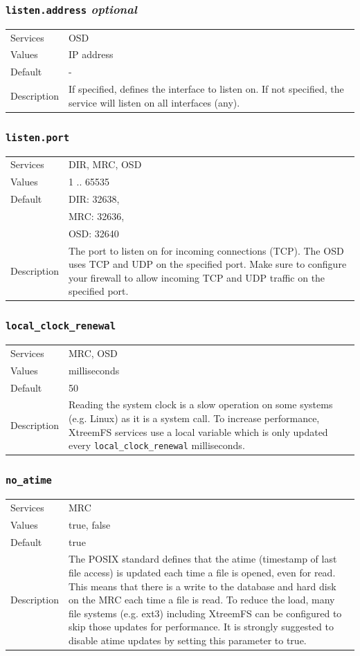 \documentclass[a4paper,10pt]{book}
\begin{document}
\subsubsection{\texttt{listen.address} \textit{optional}}
\begin{tabular}{lp{10cm}}
 Services & OSD\\
 Values   & IP address \\
 Default  & -\\
 Description & If specified, defines the interface to listen on. If not specified, the service will listen on all interfaces (any).
\end{tabular}

\subsubsection{\texttt{listen.port}}
\begin{tabular}{lp{10cm}}
 Services & DIR, MRC, OSD\\
 Values   & 1 .. 65535 \\
 Default  & DIR: 32638,\\
 & MRC: 32636,\\
 & OSD: 32640 \\
 Description & The port to listen on for incoming connections (TCP). The OSD uses TCP and UDP on the specified port. Make sure to configure your firewall to allow incoming TCP and UDP traffic on the specified port.
\end{tabular}

\subsubsection{\texttt{local\_clock\_renewal}}
\begin{tabular}{lp{10cm}}
 Services & MRC, OSD\\
 Values   & milliseconds \\
 Default  & 50\\
 Description & Reading the system clock is a slow operation on some systems (e.g. Linux) as it is a system call. To increase performance, XtreemFS services use a local variable which is only updated every \texttt{local\_clock\_renewal} milliseconds.
\end{tabular}

\subsubsection{\texttt{no\_atime}}
\begin{tabular}{lp{10cm}}
 Services & MRC\\
 Values   & true, false \\
 Default  & true\\
 Description & The POSIX standard defines that the atime (timestamp of last file access) is updated each time a file is opened, even for read. This means that there is a write to the database and hard disk on the MRC each time a file is read. To reduce the load, many file systems (e.g. ext3) including XtreemFS can be configured to skip those updates for performance. It is strongly suggested to disable atime updates by setting this parameter to true.
\end{tabular}
\end{document}
